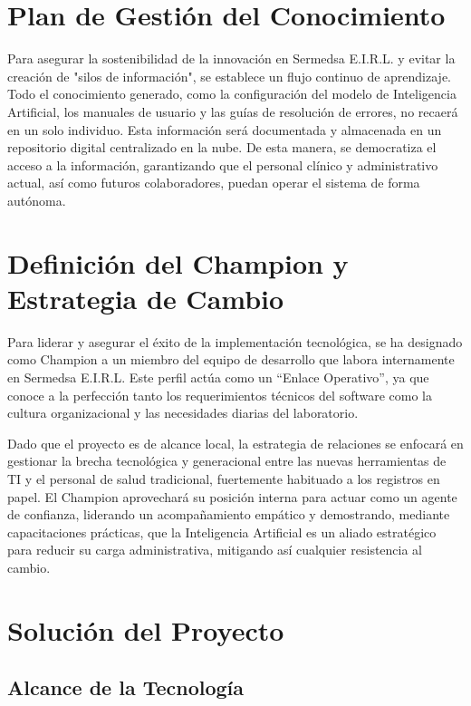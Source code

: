 \documentclass[12pt,a4paper]{article}
\begin{document}
\section{Plan de Gestión del Conocimiento}

Para asegurar la sostenibilidad de la innovación en Sermedsa E.I.R.L. y evitar la creación de "silos de información", se establece un flujo continuo de aprendizaje. Todo el conocimiento generado, como la configuración del modelo de Inteligencia Artificial, los manuales de usuario y las guías de resolución de errores, no recaerá en un solo individuo. Esta información será documentada y almacenada en un repositorio digital centralizado en la nube. De esta manera, se democratiza el acceso a la información, garantizando que el personal clínico y administrativo actual, así como futuros colaboradores, puedan operar el sistema de forma autónoma.

\section{Definición del Champion y Estrategia de Cambio}

Para liderar y asegurar el éxito de la implementación tecnológica, se ha designado como Champion a un miembro del equipo de desarrollo que labora internamente en Sermedsa E.I.R.L. Este perfil actúa como un ``Enlace Operativo'', ya que conoce a la perfección tanto los requerimientos técnicos del software como la cultura organizacional y las necesidades diarias del laboratorio.

Dado que el proyecto es de alcance local, la estrategia de relaciones se enfocará en gestionar la brecha tecnológica y generacional entre las nuevas herramientas de TI y el personal de salud tradicional, fuertemente habituado a los registros en papel. El Champion aprovechará su posición interna para actuar como un agente de confianza, liderando un acompañamiento empático y demostrando, mediante capacitaciones prácticas, que la Inteligencia Artificial es un aliado estratégico para reducir su carga administrativa, mitigando así cualquier resistencia al cambio.

\section{Solución del Proyecto}

\subsection{Alcance de la Tecnología}
\end{document}
